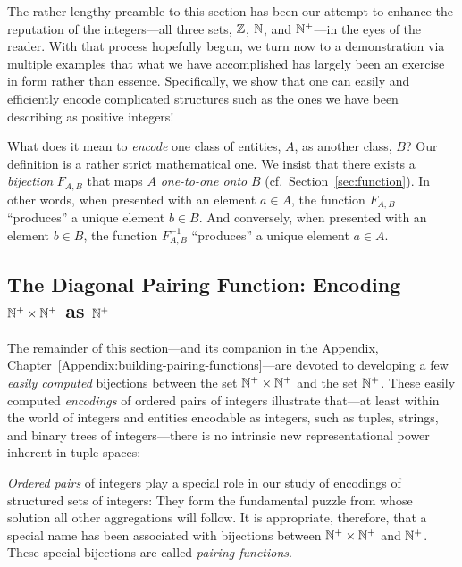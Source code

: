 \bigskip

The rather lengthy preamble to this section has been our attempt to enhance the reputation of the integers---all three sets, $\mathbb{Z}$, $\mathbb{N}$, and $\mathbb{N}^+$---in the eyes of the reader.  With that process hopefully begun, we turn now to a demonstration via multiple examples that what we have accomplished has largely been an exercise in form rather than essence.  Specifically, we show that one can easily and efficiently encode complicated structures such as the ones we have been describing as positive integers!

\medskip

 
\noindent
What does it mean to {\em encode} one class of entities, $A$, as another class, $B$?  Our definition is a rather strict mathematical one.  We insist that there exists a {\em bijection} $F_{A,B}$ that maps $A$ {\em one-to-one onto} $B$ (cf.~Section~\ref{sec:function}).  In other words, when presented with an element $a \in A$, the function $F_{A,B}$ ``produces'' a unique element $b \in B$.  And conversely, when presented with an element $b \in B$, the function $F^{-1}_{A,B}$ ``produces'' a unique element $a \in A$.

\subsection{The Diagonal Pairing Function: Encoding $\mathbb{N}^+ \times \mathbb{N}^+$ as $\mathbb{N}^+$}
\label{sec:building-pairing-functions}
\label{sec:diag-pair-fn}


The remainder of this section---and its companion in the Appendix, Chapter~\ref{Appendix:building-pairing-functions}---are devoted to developing a few {\em easily computed} bijections between the set $\mathbb{N}^+ \times \mathbb{N}^+$ and the set $\mathbb{N}^+$.  These easily computed {\em encodings} of ordered pairs of integers illustrate that---at least within the world of integers and entities encodable as integers, such as tuples, strings, and binary trees of integers---there is no intrinsic new representational power inherent in tuple-spaces: 

\smallskip

{\em Ordered pairs} of integers play a special role in our study of encodings of structured sets of integers:  They form the fundamental puzzle from whose solution all other aggregations will follow.  It is appropriate, therefore, that a special name has been associated with bijections between $\mathbb{N}^+ \times \mathbb{N}^+$ and $\mathbb{N}^+$.  These special bijections are called {\it pairing functions}. 

